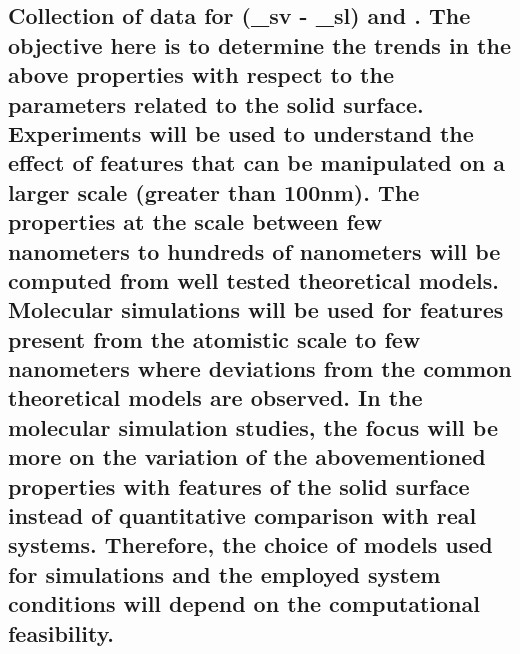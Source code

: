 \documentclass[a4paper,12pt,single,pdftex]{scrartcl}
\begin{document}
{\label{ID_392987275}\subsection{Collection of data for (\gamma_{sv} - \gamma_{sl}) and . The objective here is to determine the trends in the above properties with respect to the parameters related to the solid surface. Experiments will be used to understand the effect of features that can be manipulated on a larger scale (greater than 100nm). The properties at the scale between few nanometers to hundreds of nanometers will be computed from well tested theoretical models. Molecular simulations will be used for features present from the atomistic scale to few nanometers where deviations from the common theoretical models are observed. In the molecular simulation studies, the focus will be more on the variation of the abovementioned properties with features of the solid surface instead of quantitative comparison with real systems. Therefore, the choice of models used for simulations and the employed system conditions will depend on the computational feasibility.}

}
\end{document}
